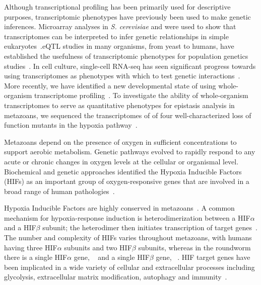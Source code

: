 Although transcriptional profiling has been primarily used for descriptive purposes,
transcriptomic phenotypes have previously been used to make genetic inferences.
Microarray analyses in \emph{S. cerevisiae} and \dicty{} were used to show
that transcriptomes can be interpreted to infer genetic relationships in simple
eukaryotes~\citep{Hughes2000, VanDriessche2005}.\@ eQTL studies in
many organisms, from yeast to humans, have established the usefulness of
transcriptomic phenotypes for population genetics studies~\citep{Brem2002,Schadt2003,
Li2006,King2014}. In cell culture, single-cell RNA-seq has seen significant
progress towards using transcriptomes as phenotypes with which to test genetic
interactions~\citep{Adamson2016,Dixit2016}.
More recently, we have identified a new developmental state
of \cel{} using whole-organism transcriptome profiling~\citep{Angeles-Albores2016a}.
To investigate the ability of whole-organism transcriptomes to serve as quantitative
phenotypes for epistasis analysis in metazoans, we sequenced the transcriptomes of
of four well-characterized loss of function mutants in the \cel{} hypoxia
pathway~\citep{Epstein2001,Shen2006,Shao2009,Jiang2001}.

Metazoans depend on the presence of oxygen in sufficient concentrations to
support aerobic metabolism. Genetic pathways evolved to rapidly respond to any
acute or chronic changes in oxygen levels at the cellular or organismal level.
Biochemical and genetic approaches identified the Hypoxia Inducible Factors
(HIFs) as an important group of oxygen-responsive genes that are involved in a
broad range of human pathologies~\citep{Semenza2012}.

Hypoxia Inducible Factors are highly conserved in metazoans~\citep{Loenarz2011}.
A common mechanism for hypoxia-response induction is heterodimerization between a
HIF$\alpha$ and a HIF$\beta$ subunit; the heterodimer then initiates
transcription of target genes~\citep{Jiang1996}. The number and complexity of
HIFs varies throughout metazoans, with humans having three HIF$\alpha$ subunits
and two HIF$\beta$ subunits, whereas in the roundworm \cel{} there is a single
HIF$\alpha$ gene, ~\citep{Jiang2001} and a single HIF$\beta$
gene, ~\citep{Powell-Coffman1998}. HIF target genes have been implicated
in a wide variety of cellular and extracellular processes including glycolysis,
extracellular matrix modification, autophagy and immunity~\citep{Semenza1994,
Bishop2004,Shen2005,Bellier2009,Semenza2012}.

